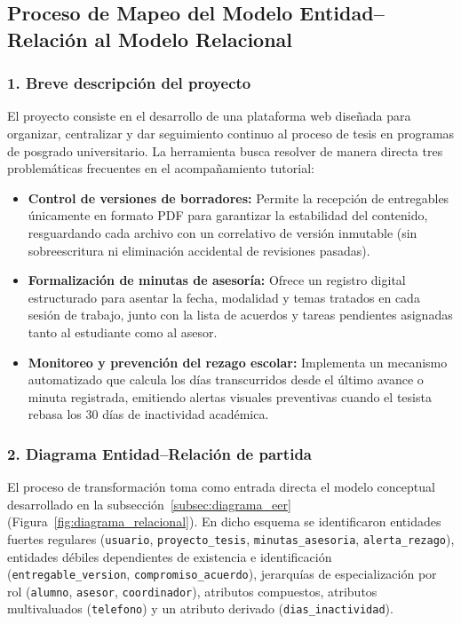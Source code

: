 \subsection{Proceso de Mapeo del Modelo Entidad--Relación al Modelo Relacional}
\label{subsec:mapeo_er_mr}

\subsubsection{1. Breve descripción del proyecto}
El proyecto consiste en el desarrollo de una plataforma web diseñada para organizar, centralizar y dar seguimiento continuo al proceso de tesis en programas de posgrado universitario\cite{sim2023technology}. La herramienta busca resolver de manera directa tres problemáticas frecuentes en el acompañamiento tutorial:
\begin{itemize}
    \item \textbf{Control de versiones de borradores:} Permite la recepción de entregables únicamente en formato PDF para garantizar la estabilidad del contenido, resguardando cada archivo con un correlativo de versión inmutable (sin sobreescritura ni eliminación accidental de revisiones pasadas)\cite{iso32000, chacon2014progit}.
    \item \textbf{Formalización de minutas de asesoría:} Ofrece un registro digital estructurado para asentar la fecha, modalidad y temas tratados en cada sesión de trabajo, junto con la lista de acuerdos y tareas pendientes asignadas tanto al estudiante como al asesor\cite{pmi2021}.
    \item \textbf{Monitoreo y prevención del rezago escolar:} Implementa un mecanismo automatizado que calcula los días transcurridos desde el último avance o minuta registrada, emitiendo alertas visuales preventivas cuando el tesista rebasa los 30 días de inactividad académica\cite{lando2025digital}.
\end{itemize}

\subsubsection{2. Diagrama Entidad--Relación de partida}
El proceso de transformación toma como entrada directa el modelo conceptual desarrollado en la subsección~\ref{subsec:diagrama_eer} (Figura~\ref{fig:diagrama_relacional}). En dicho esquema se identificaron entidades fuertes regulares (\texttt{usuario}, \texttt{proyecto\_tesis}, \texttt{minutas\_asesoria}, \texttt{alerta\_rezago}), entidades débiles dependientes de existencia e identificación (\texttt{entregable\_version}, \texttt{compromiso\_acuerdo}), jerarquías de especialización por rol (\texttt{alumno}, \texttt{asesor}, \texttt{coordinador}), atributos compuestos, atributos multivaluados (\texttt{telefono}) y un atributo derivado (\texttt{dias\_inactividad}).

